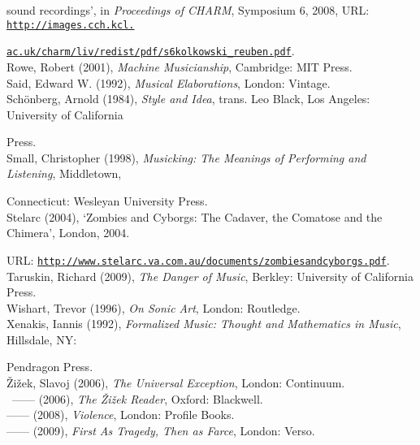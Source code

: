 sound recordings', in \emph{Proceedings of CHARM}, Symposium 6, 2008, URL: \href{http://images.cch.kcl.ac.uk/charm/liv/redist/pdf/s6kolkowski_reuben.pdf}{\texttt{http://images.cch.kcl.}}

\href{http://images.cch.kcl.ac.uk/charm/liv/redist/pdf/s6kolkowski_reuben.pdf}{\texttt{ac.uk/charm/liv/redist/pdf/s6kolkowski\_reuben.pdf}}.
\hypertarget{rowe}{}\\
Rowe, Robert (2001), \emph{Machine Musicianship}, Cambridge: MIT Press. 
\hypertarget{said}{}\\
Said, Edward W. (1992), \emph{Musical Elaborations}, London: Vintage. 
\hypertarget{schoen}{}\\
Sch\"{o}nberg, Arnold (1984),  \emph{Style and Idea}, trans. Leo Black, Los Angeles: University of California

Press. 
\hypertarget{small}{}\\
Small, Christopher (1998), \emph{Musicking: The Meanings of Performing and Listening}, Middletown, 

Connecticut: Wesleyan University Press. 
\hypertarget{stelarc}{}\\
Stelarc (2004), `Zombies and Cyborgs: The Cadaver, the Comatose and the Chimera', London, 2004.

URL: \href{http://www.stelarc.va.com.au/documents/zombiesandcyborgs.pdf}{\texttt{http://www.stelarc.va.com.au/documents/zombiesandcyborgs.pdf}}.
\hypertarget{taruskin}{}\\
Taruskin, Richard (2009), \emph{The Danger of Music}, Berkley: University of California Press. 
\hypertarget{wishart}{}\\
Wishart, Trevor (1996), \emph{On Sonic Art}, London: Routledge. 
\hypertarget{xenakis}{}\\
Xenakis, Iannis (1992), \emph{Formalized Music: Thought and Mathematics in Music}, Hillsdale, NY: 

Pendragon Press. 
\hypertarget{zizekuniv}{}\\
\v{Z}i\v{z}ek, Slavoj (2006), \emph{The Universal Exception}, London: Continuum. 
\hypertarget{zizekreader}{}\\\
------ (2006), \emph{The \v{Z}i\v{z}ek Reader}, Oxford: Blackwell.
\hypertarget{zizekviolence}{}\\
------ (2008), \emph{Violence}, London: Profile Books. 
\hypertarget{zizektragedy}{}\\
------ (2009), \emph{First As Tragedy, Then as Farce}, London: Verso.\\
